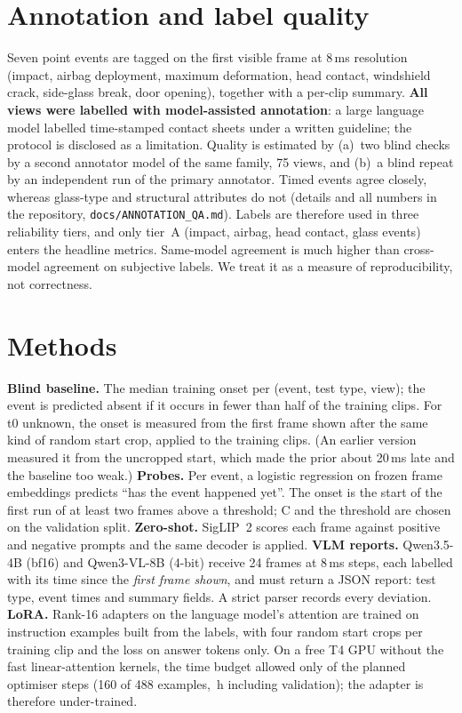\documentclass[10pt,twocolumn]{article}
\begin{document}
\section{Annotation and label quality}
Seven point events are tagged on the first visible frame at 8\,ms resolution (impact, airbag
deployment, maximum deformation, head contact, windshield crack, side-glass break, door
opening), together with a per-clip summary. \textbf{All \NLabelled{} views were labelled with model-assisted
annotation}: a large language model labelled time-stamped contact sheets under a written
guideline; the protocol is disclosed as a limitation. Quality is estimated by
(a)~two blind checks by a second annotator model of the same family, 75 views, and
(b)~a blind repeat by an independent run of the primary annotator. Timed events agree closely,
whereas glass-type and structural attributes do not (details and all numbers in the repository,
\texttt{docs/ANNOTATION\_QA.md}). Labels are therefore used in three reliability tiers, and
only tier~A (impact, airbag, head contact, glass events) enters the headline metrics.
Same-model agreement is much higher than cross-model agreement on subjective labels. We treat
it as a measure of reproducibility, not correctness.

\section{Methods}
\textbf{Blind baseline.} The median training onset per (event, test type, view); the event is
predicted absent if it occurs in fewer than half of the training clips. For t0 unknown, the
onset is measured from the first frame shown after the same kind of random start crop, applied
to the training clips. (An earlier version measured it from the uncropped start, which made the
prior about 20\,ms late and the baseline too weak.)
\textbf{Probes.} Per event, a logistic regression on frozen frame embeddings predicts
``has the event happened yet''. The onset is the start of the first run of at least two frames
above a threshold; C and the threshold are chosen on the validation split.
\textbf{Zero-shot.} SigLIP~2 scores each frame against positive and negative prompts and the
same decoder is applied.
\textbf{VLM reports.} Qwen3.5-4B (bf16) and Qwen3-VL-8B (4-bit) receive 24 frames at 8\,ms
steps, each labelled with its time since the \emph{first frame shown}, and must return a JSON
report: test type, event times and summary fields. A strict parser records every deviation.
\textbf{LoRA.} Rank-16 adapters on the language model's attention are trained on
instruction examples built from the labels, with four random start crops per training clip and
the loss on answer tokens only. On a free T4 GPU without the fast linear-attention kernels,
the time budget allowed only \LoraSteps{} of the planned \LoraPlannedSteps{} optimiser steps
(160 of 488 examples, \LoraTrainHours{}\,h including validation); the adapter is therefore
under-trained.
\end{document}
